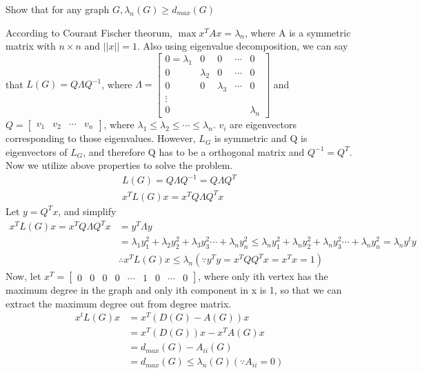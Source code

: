 \documentclass{article}
\begin{document}
\begin{problem}
    Show that for any graph $G, \lambda_n(G) \geq d_{max}(G)$

    According to Courant Fischer theorum, $\max {x^T A x}= \lambda_n$, where A is a symmetric matrix with $n \times n$ and $||x|| = 1$. Also using eigenvalue decomposition, we can say that $L(G) = Q \Lambda Q^{-1}$, where $\Lambda = \begin{bmatrix}
        0 = \lambda_1 & 0 & 0 & \cdots & 0\\
        0 & \lambda_2 & 0 & \cdots & 0\\
        0 & 0 & \lambda_3 & \cdots & 0\\
        \vdots & & &\\
        0 &  & & &\lambda_n
    \end{bmatrix}$ and $Q = \begin{bmatrix}
        v_1 & v_2 & \cdots & v_n
    \end{bmatrix}$, where $\lambda_1 \leq \lambda_2 \leq \cdots \leq \lambda_n$.  $v_i$ are eigenvectors corresponding to those eigenvalues. However, $L_G$ is symmetric
    and Q is eigenvectors of $L_G$, and therefore Q has to be a orthogonal matrix and $Q^{-1} = Q^{T}$.
    Now we utilize above properties to solve the problem. 
    \begin{align*}
        L(G) = Q \Lambda Q^{-1} = Q \Lambda Q^{T}\\
        x^T L(G) x = x^T  Q \Lambda Q^{T} x
    \end{align*}
    Let $y = Q^T x$, and simplify
    \begin{align*}
        x^T L(G) x = x^T  Q \Lambda Q^{T} x &= y^T \Lambda y\\
        &=\lambda_1 y_1^2 + \lambda_2 y_2^2 + \lambda_3 y_3^2 \cdots + \lambda_n y_n^2
        \leq \lambda_n y_1^2 + \lambda_n y_2^2 + \lambda_n y_3^2 \cdots + \lambda_n y_n^2 = \lambda_n y^ty\\ 
        &\therefore x^T L(G) x \leq \lambda_n (\because y^Ty = x^TQQ^Tx = x^Tx = 1)
    \end{align*}
    Now, let $x^T = \begin{bmatrix}
        0 &0 &0 &0 &\cdots &1 & 0 & \cdots &0
    \end{bmatrix}$, where only ith vertex has the maximum degree in the graph and only ith component in x is 1, so that we can extract the maximum degree out from degree matrix. 
    \begin{align*}
        x^t L(G)x &= x^T (D(G) - A(G)) x \\
        &= x^T(D(G))x - x^TA(G)x \\
        &= d_{max}(G) - A_{ii}(G)\\
        &= d_{max}(G) \leq \lambda_n (G) (\because A_{ii} = 0)
    \end{align*} 

\end{problem}
\end{document}
